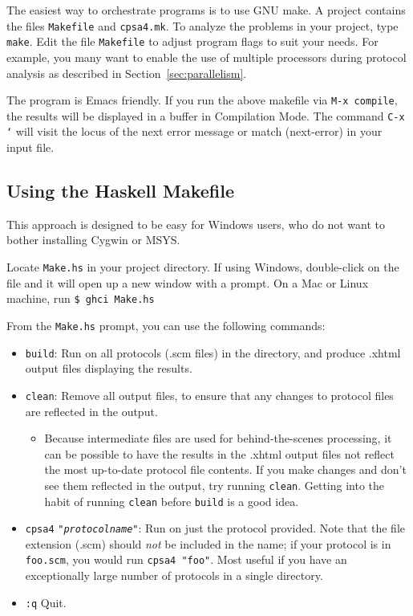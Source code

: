 The easiest way to orchestrate {\cpsa} programs is to use GNU make.  A
{\cpsa} project contains the files \texttt{Makefile} and
\texttt{cpsa4.mk}.  To analyze the problems in your project, type
\texttt{make}.  Edit the file \texttt{Makefile} to adjust program
flags to suit your needs.  For example, you many want to enable the
use of multiple processors during protocol analysis as described in
Section~\ref{sec:parallelism}.

The {\cpsa} program is Emacs friendly. If you run the above makefile
via \texttt{M-x compile}, the results will be displayed in a buffer in
Compilation Mode. The command \texttt{C-x `} will visit the locus of
the next error message or match (next-error) in your {\cpsa} input
file.

\subsection{Using the Haskell Makefile}

This approach is designed to be easy for Windows users, who do not want
to bother installing Cygwin or MSYS.

Locate \texttt{Make.hs} in your project directory. If using Windows,
double-click on the file and it will open up a new window with a
prompt. On a Mac or Linux machine, run \texttt{\$ ghci Make.hs}

From the \texttt{Make.hs} prompt, you can use the following commands:

\begin{itemize}
\item \texttt{build}: Run {\cpsa} on all protocols (.scm files) in the
  directory, and produce .xhtml output files displaying the results.
\item \texttt{clean}: Remove all {\cpsa} output files, to ensure that any
  changes to protocol files are reflected in the output.
\begin{itemize}
\item Because intermediate files are used for behind-the-scenes
  processing, it can be possible to have the results in the .xhtml
  output files not reflect the most up-to-date protocol file
  contents. If you make changes and don't see them reflected in the
  output, try running \texttt{clean}. Getting into the habit of
  running \texttt{clean} before \texttt{build} is a good idea.
\end{itemize}
\item \texttt{cpsa4} \texttt{"\textit{protocolname}"}: Run {\cpsa} on just the
  protocol provided. Note that the file extension (.scm) should
  \textit{not} be included in the name; if your protocol is in
  \texttt{foo.scm}, you would run \texttt{cpsa4 "foo"}. Most useful if you
  have an exceptionally large number of protocols in a single
  directory.
\item \texttt{:q} Quit.
\end{itemize}

